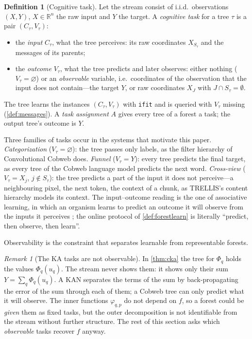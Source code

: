 \documentclass[11pt]{article}
\theoremstyle{definition}
\newtheorem{definition}[theorem]{Definition}
\theoremstyle{remark}
\newtheorem{remark}[theorem]{Remark}
\newcommand{\R}{\mathbb{R}}
\begin{document}
\begin{definition}[Cognitive task]\label{def:task}
Let the stream consist of i.i.d.\ observations $(X,Y)$, $X\in\R^n$ the raw input and
$Y$ the target.  A \emph{cognitive task} for a tree $\tau$ is a pair $(C_\tau,V_\tau)$:
\begin{itemize}[leftmargin=*]
\item the \emph{input} $C_\tau$, what the tree perceives: its raw coordinates
  $X_{S_\tau}$ and the messages of its parents;
\item the \emph{outcome} $V_\tau$, what the tree predicts and later observes: either
  nothing ($V_\tau=\varnothing$) or an \emph{observable} variable, i.e.\ coordinates of
  the observation that the input does not contain---the target $Y$, or raw coordinates
  $X_J$ with $J\cap S_\tau=\emptyset$.
\end{itemize}
The tree learns the instances $(C_\tau,V_\tau)$ with \texttt{ifit} and is queried with
$V_\tau$ missing (\cref{def:messages}).  A \emph{task assignment} $A$ gives every tree
of a forest a task; the output tree's outcome is $Y$.
\end{definition}

Three families of tasks occur in the systems that motivate this paper.
\emph{Categorization} ($V_\tau=\varnothing$): the tree passes only labels, as the filter
hierarchy of Convolutional Cobweb does.  \emph{Funnel} ($V_\tau=Y$): every tree predicts
the final target, as every tree of the Cobweb language model predicts the next word.
\emph{Cross-view} ($V_\tau=X_j$, $j\notin S_\tau$): the tree predicts a part of the input
it does not perceive---a neighbouring pixel, the next token, the context of a chunk, as
TRELLIS's content hierarchy models its context.  The input--outcome reading is the one of
associative learning, in which an organism learns to predict an outcome it will observe
from the inputs it perceives \citep{rescorla1972}; the online protocol of
\cref{def:forestlearn} is literally ``predict, then observe, then learn''.

Observability is the constraint that separates learnable from representable forests.

\begin{remark}[The KA tasks are not observable]\label{rem:kaobs}
In \cref{thm:cka} the tree for $\Phi_q$ holds the values $\Phi_q(u_q)$.  The stream
never shows them: it shows only their sum $Y=\sum_q\Phi_q(u_q)$.  A KAN separates the
terms of the sum by back-propagating the error of the sum through each of them; a Cobweb
tree can only predict what it will observe.  The inner functions $\varphi_{q,p}$ do not
depend on $f$, so a forest could be \emph{given} them as fixed tasks, but the outer
decomposition is not identifiable from the stream without further structure.  The rest
of this section asks which \emph{observable} tasks recover $f$ anyway.
\end{remark}
\end{document}
